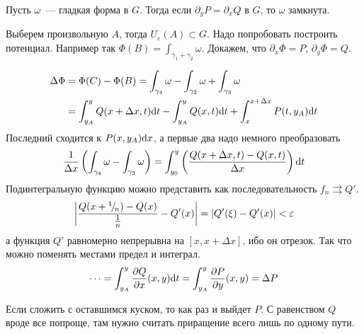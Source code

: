 \documentclass[12pt,timbord]{../../../notes}
\begin{document}
\begin{thrm}\label{thrm:lineint::closforms::suffdiff}
  Пусть $\omega$~--- гладкая форма в $G$. Тогда если $\partial_y P = \partial_x Q$ в $G$, то
  $\omega$ замкнута.  
\end{thrm}
\begin{ittproof}
  Выберем произвольную $A$, тогда $U_\varepsilon(A) \subset G$. Надо попробовать построить
  потенциал. Например так $\Phi(B) = \int_{\gamma_1 + \gamma_2} \omega$. 
  Докажем, что $\partial_x \Phi = P$, $\partial_y \Phi = Q$.

  \begin{minipage}{0.48\linewidth}
  \end{minipage}\hfill
  \begin{minipage}{0.48\linewidth}
    \[
      \begin{split}
        \Delta \Phi &= \Phi(C)-\Phi(B) = \int_{\gamma_4} \omega - \int_{\gamma_2} \omega +
        \int_{\gamma_3} \omega \\
        &= \int_{y_A}^y Q(x+\Delta x, t) \mathrm{d} t 
        - \int_{y_A}^y Q(x, t) \mathrm{d} t + \int_{x}^{x+\Delta x} P(t, y_A) \mathrm{d} t
      \end{split}
    \]
    Последний сходится к $P(x,y_A)\mathrm{d} x$, а первые два надо немного преобразовать
    \[
      \frac{1}{\Delta x} \left(\int_{\gamma_4} \omega - \int_{\gamma_2} \omega \right)
      = \int_{y_0}^y \left(\frac{Q(x+\Delta x,t ) - Q(x,t)}{\Delta x}\right) \mathrm{d} t
    \]
    Подинтегральную функцию можно представить как последовательность $f_n \rightrightarrows Q'$.
    \[
      \left| \frac{Q(x+{}^{1}\!/_{\!n} )- Q(x)}{\frac 1 n} - Q'(x)\right| = |Q'(\xi) - Q'(x) |
      <\varepsilon
    \]
    а функция $Q'$ равномерно непрерывна на $[x, x+ \Delta x]$, ибо он отрезок. Так что можно
    поменять местами предел и интеграл.
    \[
      \cdots = \int_{y_A}^y \frac{\partial Q}{\partial x}(x,y) \mathrm{d} t = \int_{y_A}^y \frac{\partial P}{\partial y} (x,y) = \Delta P
    \]
  \end{minipage}
    Если сложить с оставшимся куском, то как раз и выйдет $P$. С равенством $Q$ вроде все
    попроще, там нужно считать приращение всего лишь по одному пути.
\end{ittproof}
\end{document}
